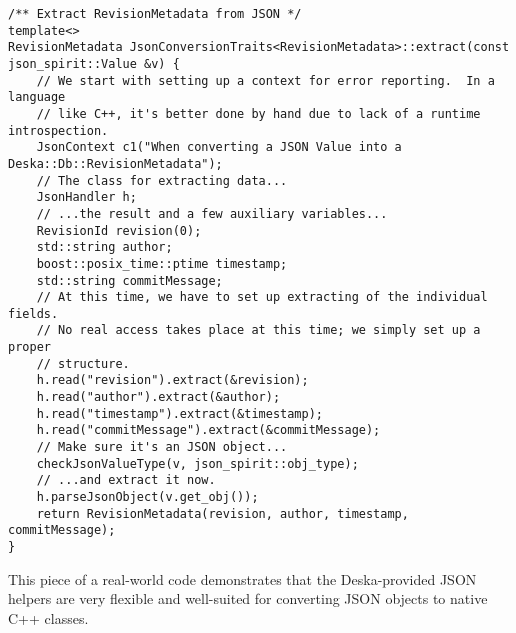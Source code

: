 \documentclass[deska]{subfiles}
\begin{document}
\begin{verbatim}
/** Extract RevisionMetadata from JSON */
template<>
RevisionMetadata JsonConversionTraits<RevisionMetadata>::extract(const json_spirit::Value &v) {
    // We start with setting up a context for error reporting.  In a language
    // like C++, it's better done by hand due to lack of a runtime introspection.
    JsonContext c1("When converting a JSON Value into a Deska::Db::RevisionMetadata");
    // The class for extracting data...
    JsonHandler h;
    // ...the result and a few auxiliary variables...
    RevisionId revision(0);
    std::string author;
    boost::posix_time::ptime timestamp;
    std::string commitMessage;
    // At this time, we have to set up extracting of the individual fields.
    // No real access takes place at this time; we simply set up a proper
    // structure.
    h.read("revision").extract(&revision);
    h.read("author").extract(&author);
    h.read("timestamp").extract(&timestamp);
    h.read("commitMessage").extract(&commitMessage);
    // Make sure it's an JSON object...
    checkJsonValueType(v, json_spirit::obj_type);
    // ...and extract it now.
    h.parseJsonObject(v.get_obj());
    return RevisionMetadata(revision, author, timestamp, commitMessage);
}
\end{verbatim}

This piece of a real-world code demonstrates that the Deska-provided JSON helpers are very flexible and well-suited for
converting JSON objects to native C++ classes.
\end{document}
